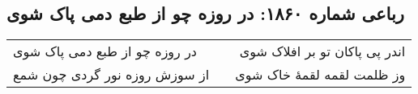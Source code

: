 \begin{center}
\section*{رباعی شماره ۱۸۶۰: در روزه چو از طبع دمی پاک شوی}
\label{sec:1860}
\begin{longtable}{l p{0.5cm} r}
در روزه چو از طبع دمی پاک شوی
&&
اندر پی پاکان تو بر افلاک شوی
\\
از سوزش روزه نور گردی چون شمع
&&
وز ظلمت لقمه لقمهٔ خاک شوی
\\
\end{longtable}
\end{center}
